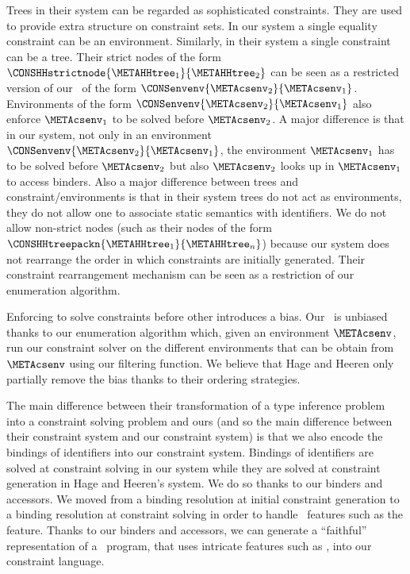 \documentclass{jfp1}
\begin{document}
Trees in their system can be regarded as sophisticated constraints.
They are used to provide extra structure on constraint sets.
%
In our system a single equality constraint can be an environment.
Similarly, in their system a single constraint can be a tree.
%
Their strict nodes of the form
$\CONSHHstrictnode{\METAHHtree_1}{\METAHHtree_2}$ can be seen as a
restricted version of our \COMPENVS\ of the form
$\CONSenvenv{\METAcsenv_2}{\METAcsenv_1}$.  Environments of the form
$\CONSenvenv{\METAcsenv_2}{\METAcsenv_1}$ also enforce $\METAcsenv_1$
to be solved before $\METAcsenv_2$.  A major difference is that in our
system, not only in an environment
$\CONSenvenv{\METAcsenv_2}{\METAcsenv_1}$, the environment
$\METAcsenv_1$ has to be solved before $\METAcsenv_2$ but also
$\METAcsenv_2$ looks up in $\METAcsenv_1$ to access binders.
%
Also a major difference between trees and constraint/environments is
that in their system trees do not act as environments, they do not
allow one to associate static semantics with identifiers.
%
We do not allow non-strict nodes (such as their nodes of the form
$\CONSHHtreepackn{\METAHHtree_1}{\METAHHtree_n}$) because our system
does not rearrange the order in which constraints are initially
generated.
%
Their constraint rearrangement mechanism can be seen as a
restriction of our enumeration algorithm.

Enforcing to solve constraints before other introduces a bias.  Our
\TES\ is unbiased thanks to our enumeration algorithm which, given an
environment $\METAcsenv$, run our constraint solver on the different
environments that can be obtain from $\METAcsenv$ using our filtering
function.  We believe that Hage and Heeren only partially remove the
bias thanks to their ordering strategies.

The main difference between their transformation of a type inference
problem into a constraint solving problem and ours (and so the main
difference between their constraint system and our constraint system)
is that we also encode the bindings of identifiers into our constraint
system.  Bindings of identifiers are solved at constraint solving in
our system while they are solved at constraint generation in Hage and
Heeren's system.  We do so thanks to our binders and accessors.  We
moved from a binding resolution at initial constraint generation to a
binding resolution at constraint solving in order to handle \SML\
features such as the  feature.  Thanks to our binders and
accessors, we can generate a ``faithful'' representation of a \SML\
program, that uses intricate features such as , into our
constraint language.
\end{document}
